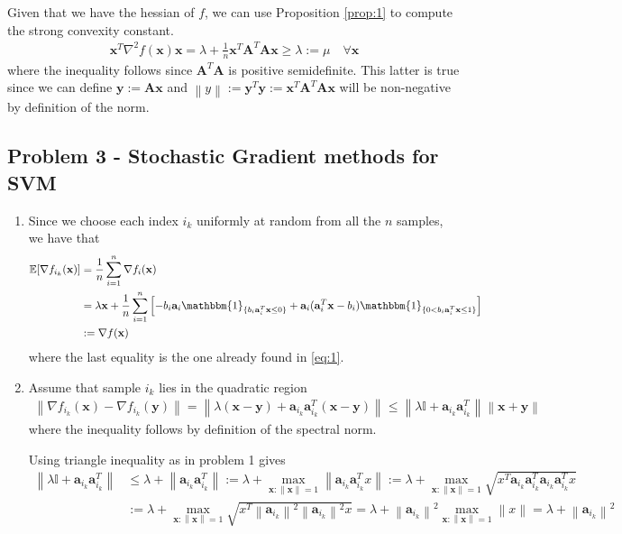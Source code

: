 \documentclass[letterpaper]{article}
\renewcommand{\aa}{\mathbf{a}}
\providecommand{\xx}{\mathbf{x}}
\providecommand{\yy}{\mathbf{y}}
\providecommand{\1}{\mathbf{1}}
\providecommand{\0}{\mathbf{0}}
\providecommand{\mA}{\mathbf{A}}
\providecommand{\norm}[1]{\ensuremath{\left\lVert#1\right\rVert}}
\newcommand{\E}{\mathbb{E}}
\begin{document}
\begin{enumerate}[label=(\alph*)]
    Given that we have the hessian of $f$, we can use Proposition \ref{prop:1} to compute the strong convexity constant.
    \begin{align}
        \xx^T \nabla^2 f(\xx) \xx  = \lambda + \frac{1}{n}\xx^T\mA^T \mA \xx \geq \lambda := \mu \quad \forall \xx
    \end{align}
    where the inequality follows since $\mA^T \mA$ is positive semidefinite. This latter is true since we can define $\yy:=\mA \xx$ and $\norm{y} := \yy^T \yy := \xx^T\mA^T \mA \xx $ will be non-negative by definition of the norm.
\end{enumerate}

\subsection*{Problem 3 - Stochastic Gradient methods for SVM}
\begin{enumerate}[label=(\alph*)]
    \item
    Since we choose each index $i_k$ uniformly at random from all the $n$ samples, we have that
    \begin{align}
        \E[\nabla f_{i_k}(\xx)] &= \frac{1}{n} \sum_{i=1}^{n} \nabla f_i(\xx) \\
        &= \lambda \xx + \frac{1}{n}\sum_{i=1}^n \left[ -b_i \aa_i\mathbbm{1}_{\{b_i \aa_i^T \xx  \leq 0\}} + \aa _i(\aa_i^T \xx - b_i )\mathbbm{1}_{\{0<b_i \aa_i^T \xx\leq 1\}} \right] \\
        &:= \nabla f(\xx)
    \end{align}
    where the last equality is the one already found in \eqref{eq:1}.
    
    \item Assume that sample $i_k$ lies in the quadratic region
    \begin{align}
        \norm{\nabla f_{i_k}(\xx) - \nabla f_{i_k}(\yy)} = \norm{\lambda(\xx - \yy) + \aa_{i_k} \aa_{i_k}^T (\xx - \yy)} \leq \norm{\lambda\mathbb{I} + \aa_{i_k} \aa_{i_k}^T}\norm{\xx + \yy}
    \end{align}
    where the inequality follows by definition of the spectral norm.
    
    Using triangle inequality as in problem 1 gives
    \begin{align}
        \norm{\lambda\mathbb{I} + \aa_{i_k} \aa_{i_k}^T} &\leq \lambda + \norm{\aa_{i_k} \aa_{i_k}^T} := \lambda + \max_{\xx:\norm{\xx}=1} \norm{\aa_{i_k} \aa_{i_k}^T x} := \lambda + \max_{\xx:\norm{\xx}=1} \sqrt{x^T \aa_{i_k} \aa_{i_k} ^T \aa_{i_k} \aa_{i_k}^T x} \\
        &:=\lambda + \max_{\xx:\norm{\xx}=1} \sqrt{x^T \norm{\aa_{i_k}} ^2 \norm{\aa_{i_k}} ^2 x} = \lambda + \norm{\aa_{i_k}} ^2 \max_{\xx:\norm{\xx}=1} \norm{x} = \lambda + \norm{\aa_{i_k}} ^2
    \end{align}
    
\end{enumerate}
\end{document}

